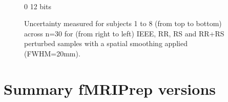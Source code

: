 \documentclass{article}
\newcommand{\fmriprep}{fMRIPrep\xspace}
\begin{document}
\begin{appendices}
\begin{landscape}
\begin{figure}
\begin{subfigure}[t]{0.2\paperheight}
            \end{subfigure} \\
            \hspace*{6cm} 0  12 bits
            \caption{Uncertainty measured for subjects 1 to 8 (from top to bottom) across n=30 for
                (from right to left) IEEE, RR, RS and RR+RS perturbed samples with a spatial smoothing applied (FWHM=20mm). }
            \label{fig:uncertainty_20mm}

        \end{figure}
    \end{landscape}


    \section*{Summary \fmriprep versions}


\end{appendices}
\end{document}
